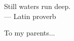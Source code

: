 \cleardoublepage
\thispagestyle{empty}


\vspace*{3cm}

\begin{raggedleft}
    	Still waters run deep. \\
     --- Latin proverb\\
\end{raggedleft}

\vspace{4cm}

\begin{center}
    To my parents...
\end{center}


